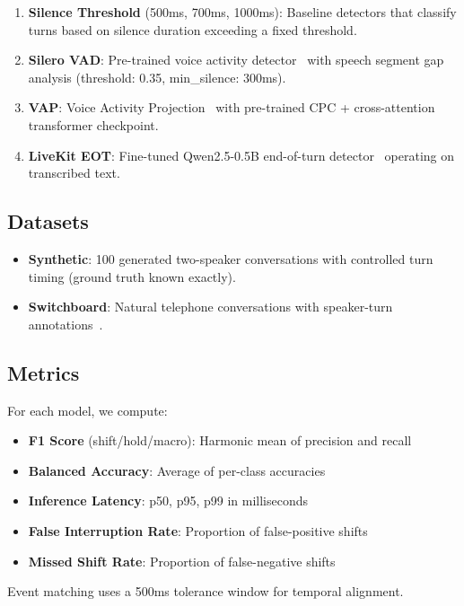 \documentclass[conference]{IEEEtran}
\begin{document}
\begin{enumerate}
    \item \textbf{Silence Threshold} (500ms, 700ms, 1000ms): Baseline detectors
          that classify turns based on silence duration exceeding a fixed threshold.
    \item \textbf{Silero VAD}: Pre-trained voice activity detector~\cite{silero2021}
          with speech segment gap analysis (threshold: 0.35, min\_silence: 300ms).
    \item \textbf{VAP}: Voice Activity Projection~\cite{ekstedt2024vap} with
          pre-trained CPC + cross-attention transformer checkpoint.
    \item \textbf{LiveKit EOT}: Fine-tuned Qwen2.5-0.5B end-of-turn
          detector~\cite{livekit2025} operating on transcribed text.
\end{enumerate}

\subsection{Datasets}
\begin{itemize}
    \item \textbf{Synthetic}: 100 generated two-speaker conversations with
          controlled turn timing (ground truth known exactly).
    \item \textbf{Switchboard}: Natural telephone conversations with
          speaker-turn annotations~\cite{godfrey1992}.
\end{itemize}

\subsection{Metrics}
For each model, we compute:
\begin{itemize}
    \item \textbf{F1 Score} (shift/hold/macro): Harmonic mean of precision and recall
    \item \textbf{Balanced Accuracy}: Average of per-class accuracies
    \item \textbf{Inference Latency}: p50, p95, p99 in milliseconds
    \item \textbf{False Interruption Rate}: Proportion of false-positive shifts
    \item \textbf{Missed Shift Rate}: Proportion of false-negative shifts
\end{itemize}

Event matching uses a 500ms tolerance window for temporal alignment.
\end{document}
